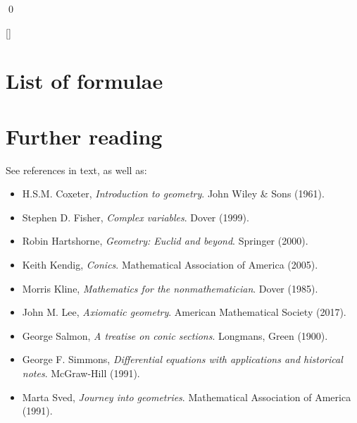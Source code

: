 \documentclass[a4paper,leqno,10pt]{article}
\theoremstyle{exercise}
\theoremstyle{plain}
\theoremstyle{definition}
\theoremstyle{remark}
\begin{document}
\qed

\appendix
{}[{\titlerule[0.8pt]}]
\section{List of formulae}

\section{Further reading}
See references in text, as well as:
\begin{itemize}
  \item H.S.M. Coxeter, \emph{Introduction to geometry}. John Wiley \& Sons (1961).
  \item Stephen D. Fisher, \emph{Complex variables}. Dover (1999).
  \item Robin Hartshorne, \emph{Geometry: Euclid and beyond}. Springer (2000).
  \item Keith Kendig, \emph{Conics}. Mathematical Association of America (2005).
  \item Morris Kline, \emph{Mathematics for the nonmathematician}. Dover (1985).
  \item John M. Lee, \emph{Axiomatic geometry}. American Mathematical Society (2017).
  \item George Salmon, \emph{A treatise on conic sections}. Longmans, Green (1900).
  \item George F. Simmons, \emph{Differential equations with applications and historical notes}. McGraw-Hill (1991).
  \item Marta Sved, \emph{Journey into geometries}. Mathematical Association of America (1991).
\end{itemize}
\end{document}
